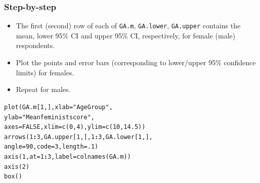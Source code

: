 \documentclass{beamer}\usepackage[]{graphicx}\usepackage[]{color}
\makeatletter
\newcommand{\hlnum}[1]{\textcolor[rgb]{0.533,0,0.133}{#1}}%
\newcommand{\hlstr}[1]{\textcolor[rgb]{0.667,0.267,0}{#1}}%
\newcommand{\hlopt}[1]{\textcolor[rgb]{0,0,0}{\textbf{#1}}}%
\newcommand{\hlstd}[1]{\textcolor[rgb]{0,0,0}{#1}}%
\newcommand{\hlkwc}[1]{\textcolor[rgb]{0,0,0.4}{#1}}%
\newcommand{\hlkwd}[1]{\textcolor[rgb]{0,0.267,0.4}{#1}}%
\newenvironment{kframe}{%
 \def\at@end@of@kframe{}%
 \ifinner\ifhmode%
  \def\at@end@of@kframe{\end{minipage}}%
  \begin{minipage}{\columnwidth}%
 \fi\fi%
 \def\FrameCommand##1{\hskip\@totalleftmargin \hskip-\fboxsep
 \colorbox{shadecolor}{##1}\hskip-\fboxsep
     \hskip-\linewidth \hskip-\@totalleftmargin \hskip\columnwidth}%
 \MakeFramed {\advance\hsize-\width
   \@totalleftmargin\z@ \linewidth\hsize
   \@setminipage}}%
 {\par\unskip\endMakeFramed%
 \at@end@of@kframe}
\newenvironment{knitrout}{}{} %
\makeatother
\begin{document}
\begin{frame}[fragile]
  \frametitle{Step-by-step}
\begin{itemize}
\item The first (second) row of each of \texttt{GA.m}, \texttt{GA.lower}, \texttt{GA.upper} contains the mean, lower 95\% CI and upper 95\% CI, respectively, for female (male) respondents.
\item Plot the points and error bars (corresponding to lower/upper 95\% confidence limits) for females.
\item Repeat for males.
\end{itemize}
\begin{knitrout}
\color{fgcolor}\begin{kframe}
\begin{alltt}
\hlkwd{plot}\hlstd{(GA.m[}\hlnum{1}\hlstd{, ],} \hlkwc{xlab} \hlstd{=} \hlstr{"Age Group"}\hlstd{,}
     \hlkwc{ylab} \hlstd{=} \hlstr{"Mean feminist score"}\hlstd{,}
     \hlkwc{axes} \hlstd{=} \hlnum{FALSE}\hlstd{,} \hlkwc{xlim} \hlstd{=} \hlkwd{c}\hlstd{(}\hlnum{0}\hlstd{,} \hlnum{4}\hlstd{),} \hlkwc{ylim} \hlstd{=} \hlkwd{c}\hlstd{(}\hlnum{10}\hlstd{,} \hlnum{14.5}\hlstd{))}
\hlkwd{arrows}\hlstd{(}\hlnum{1}\hlopt{:}\hlnum{3}\hlstd{, GA.upper[}\hlnum{1}\hlstd{, ],} \hlnum{1}\hlopt{:}\hlnum{3}\hlstd{, GA.lower[}\hlnum{1}\hlstd{, ],}
       \hlkwc{angle} \hlstd{=} \hlnum{90}\hlstd{,} \hlkwc{code} \hlstd{=} \hlnum{3}\hlstd{,} \hlkwc{length} \hlstd{=} \hlnum{.1}\hlstd{)}
\hlkwd{axis}\hlstd{(}\hlnum{1}\hlstd{,} \hlkwc{at} \hlstd{=} \hlnum{1}\hlopt{:}\hlnum{3}\hlstd{,} \hlkwc{label} \hlstd{=} \hlkwd{colnames}\hlstd{(GA.m))}
\hlkwd{axis}\hlstd{(}\hlnum{2}\hlstd{)}
\hlkwd{box}\hlstd{()}
\end{alltt}
\end{kframe}
\end{knitrout}
\end{frame} 
\end{document}
